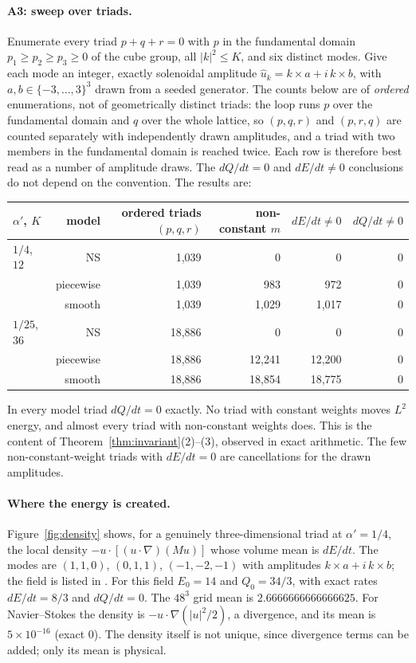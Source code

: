 \documentclass[11pt,a4paper]{article}
\theoremstyle{definition}
\begin{document}
\paragraph{A3: sweep over triads.} Enumerate every triad $p+q+r=0$ with $p$ in the fundamental domain $p_1\ge p_2\ge p_3\ge0$ of the cube group, all $|k|^2\le K$, and six distinct modes. Give each mode an integer, exactly solenoidal amplitude $\hat u_k=k\times a+i\,k\times b$, with $a,b\in\{-3,\dots,3\}^3$ drawn from a seeded generator. The counts below are of \emph{ordered} enumerations, not of geometrically distinct triads: the loop runs $p$ over the fundamental domain and $q$ over the whole lattice, so $(p,q,r)$ and $(p,r,q)$ are counted separately with independently drawn amplitudes, and a triad with two members in the fundamental domain is reached twice. Each row is therefore best read as a number of amplitude draws. The $dQ/dt=0$ and $dE/dt\ne0$ conclusions do not depend on the convention. The results are:
\begin{center}\small
\begin{tabular}{lrrrrr}
\toprule
$\alpha'$, $K$ & model & ordered triads $(p,q,r)$ & non-constant $m$ & $dE/dt\neq0$ & $dQ/dt\neq0$ \\
\midrule
$1/4$, $12$ & NS & 1{,}039 & 0 & 0 & 0 \\
 & piecewise & 1{,}039 & 983 & 972 & 0 \\
 & smooth & 1{,}039 & 1{,}029 & 1{,}017 & 0 \\
$1/25$, $36$ & NS & 18{,}886 & 0 & 0 & 0 \\
 & piecewise & 18{,}886 & 12{,}241 & 12{,}200 & 0 \\
 & smooth & 18{,}886 & 18{,}854 & 18{,}775 & 0 \\
\bottomrule
\end{tabular}
\end{center}
In every model triad $dQ/dt=0$ exactly. No triad with constant weights moves $L^2$ energy, and almost every triad with non-constant weights does. This is the content of Theorem~\ref{thm:invariant}(2)--(3), observed in exact arithmetic. The few non-constant-weight triads with $dE/dt=0$ are cancellations for the drawn amplitudes.

\paragraph{Where the energy is created.} Figure~\ref{fig:density} shows, for a genuinely three-dimensional triad at $\alpha'=1/4$, the local density $-u\cdot[(u\cdot\nabla)(Mu)]$ whose volume mean is $dE/dt$. The modes are $(1,1,0)$, $(0,1,1)$, $(-1,-2,-1)$ with amplitudes $k\times a+i\,k\times b$; the field is listed in . For this field $E_0=14$ and $Q_0=34/3$, with exact rates $dE/dt=8/3$ and $dQ/dt=0$. The $48^3$ grid mean is $2.6666666666666625$. For Navier--Stokes the density is $-u\cdot\nabla(|u|^2/2)$, a divergence, and its mean is $5\times10^{-16}$ (exact $0$). The density itself is not unique, since divergence terms can be added; only its mean is physical.
\end{document}

